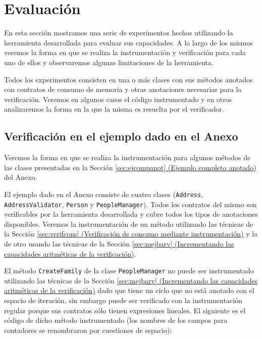 \documentclass[12pt,a4paper]{article}
\newcommand\mono[1]{\texttt{#1}}
\begin{document}
	\newpage
	\section{Evaluación} \label{sec:exp}
		En esta sección mostramos una serie de experimentos hechos utilizando la herramienta desarrollada para evaluar sus capacidades. A lo largo de los mismos veremos la forma en que se realiza la instrumentación y verificación para cada uno de ellos y observaremos algunas limitaciones de la herramienta.

		Todos los experimentos consisten en una o más clases con sus métodos anotados con contratos de consumo de memoria y otras anotaciones necesarias para la verificación. Veremos en algunos casos el código instrumentado y en otros analizaremos la forma en la que la misma es resuelta por el verificador.
		\subsection{Verificación en el ejemplo dado en el Anexo}
			Veremos la forma en que se realiza la instrumentación para algunos métodos de las clases presentadas en la Sección \hyperref[sec:ejcompanot]{\ref*{sec:ejcompanot} (Ejemplo completo anotado)} del Anexo.

			El ejemplo dado en el Anexo consiste de cuatro clases (\mono{Address}, \mono{AddressValidator}, \mono{Person} y \mono{PeopleManager}). Todos los contratos del mismo son verificables por la herramienta desarrollada y cubre todos los tipos de anotaciones disponibles. Veremos la instrumentación de un método utilizando las técnicas de la Sección \hyperref[sec:verifcons]{\ref*{sec:verifcons} (Verificación de consumo mediante instrumentación)} y la de otro usando las técnicas de la Sección \hyperref[sec:mejbarv]{\ref*{sec:mejbarv} (Incrementando las capacidades aritméticas de la verificación)}.

			El método \mono{CreateFamily} de la clase \mono{PeopleManager} no puede ser instrumentado utilizando las técnicas de la Sección \hyperref[sec:mejbarv]{\ref*{sec:mejbarv} (Incrementando las capacidades aritméticas de la verificación)} dado que tiene un ciclo que no está anotado con el espacio de iteración, sin embargo puede ser verificado con la instrumentación regular porque sus contratos sólo tienen expresiones lineales. El siguiente es el código de dicho método instrumentado (los nombres de los campos para contadores se renombraron por cuestiones de espacio):
\end{document}
